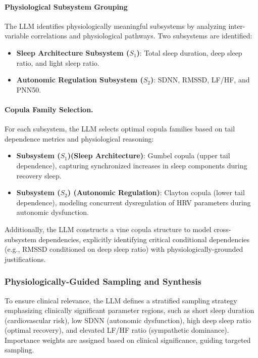 \documentclass[preprint,12pt]{elsarticle}
\begin{document}
\paragraph{Physiological Subsystem Grouping} The LLM identifies physiologically meaningful subsystems by analyzing inter-variable correlations and physiological pathways. Two subsystems are identified:

\begin{itemize}
    \item \textbf{Sleep Architecture Subsystem ($S_1$)}: Total sleep duration, deep sleep ratio, and light sleep ratio.
    \item \textbf{Autonomic Regulation Subsystem ($S_2$)}: SDNN, RMSSD, LF/HF, and PNN50.
\end{itemize}

\paragraph{Copula Family Selection.} For each subsystem, the LLM selects optimal copula families based on tail dependence metrics and physiological reasoning:

\begin{itemize}
\item \textbf{Subsystem ($S_1$)(Sleep Architecture)}: Gumbel copula (upper tail dependence), capturing synchronized increases in sleep components during recovery sleep.
\item \textbf{Subsystem ($S_2$) (Autonomic Regulation)}: Clayton copula (lower tail dependence), modeling concurrent dysregulation of HRV parameters during autonomic dysfunction.
\end{itemize}

Additionally, the LLM constructs a vine copula structure to model cross-subsystem dependencies, explicitly identifying critical conditional dependencies (e.g., RMSSD conditioned on deep sleep ratio) with physiologically-grounded justifications.

\subsubsection{Physiologically-Guided Sampling and Synthesis}

To ensure clinical relevance, the LLM defines a stratified sampling strategy emphasizing clinically significant parameter regions, such as short sleep duration (cardiovascular risk), low SDNN (autonomic dysfunction), high deep sleep ratio (optimal recovery), and elevated LF/HF ratio (sympathetic dominance). Importance weights are assigned based on clinical significance, guiding targeted sampling.
\end{document}
